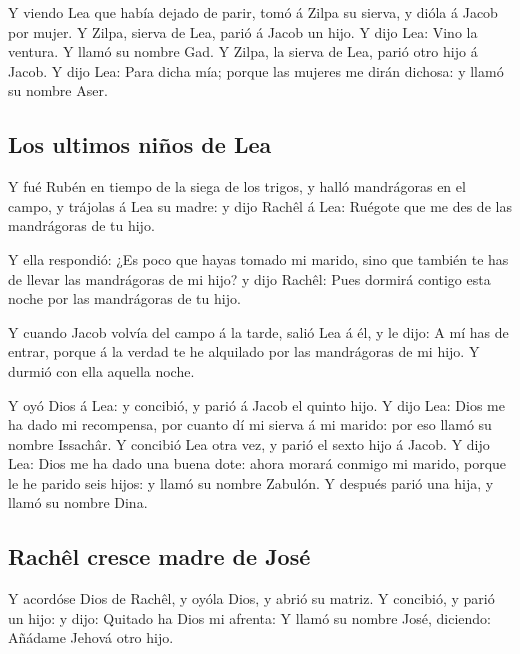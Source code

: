  Y viendo Lea que había dejado de parir, tomó á Zilpa su
sierva, y dióla á Jacob por mujer.  Y Zilpa, sierva de Lea,
parió á Jacob un hijo.  Y dijo Lea: Vino la ventura. Y
llamó su nombre Gad.  Y Zilpa, la sierva de Lea, parió otro
hijo á Jacob.  Y dijo Lea: Para dicha mía; porque las
mujeres me dirán dichosa: y llamó su nombre Aser.

\hypertarget{los-ultimos-niuxf1os-de-lea}{%
\subsection{Los ultimos niños de
Lea}\label{los-ultimos-niuxf1os-de-lea}}

 Y fué Rubén en tiempo de la siega de los trigos, y halló
mandrágoras en el campo, y trájolas á Lea su madre: y dijo Rachêl á Lea:
Ruégote que me des de las mandrágoras de tu hijo.

 Y ella respondió: ¿Es poco que hayas tomado mi marido,
sino que también te has de llevar las mandrágoras de mi hijo? y dijo
Rachêl: Pues dormirá contigo esta noche por las mandrágoras de tu hijo.

 Y cuando Jacob volvía del campo á la tarde, salió Lea á
él, y le dijo: A mí has de entrar, porque á la verdad te he alquilado
por las mandrágoras de mi hijo. Y durmió con ella aquella noche.

 Y oyó Dios á Lea: y concibió, y parió á Jacob el quinto
hijo.  Y dijo Lea: Dios me ha dado mi recompensa, por
cuanto dí mi sierva á mi marido: por eso llamó su nombre Issachâr.
 Y concibió Lea otra vez, y parió el sexto hijo á Jacob.
 Y dijo Lea: Dios me ha dado una buena dote: ahora morará
conmigo mi marido, porque le he parido seis hijos: y llamó su nombre
Zabulón.  Y después parió una hija, y llamó su nombre Dina.

\hypertarget{rachuxeal-cresce-madre-de-josuxe9}{%
\subsection{Rachêl cresce madre de
José}\label{rachuxeal-cresce-madre-de-josuxe9}}

 Y acordóse Dios de Rachêl, y oyóla Dios, y abrió su
matriz.  Y concibió, y parió un hijo: y dijo: Quitado ha
Dios mi afrenta:  Y llamó su nombre José, diciendo: Añádame
Jehová otro hijo.

